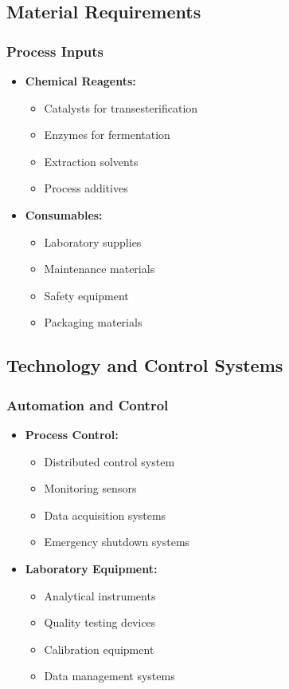 \subsection{Material Requirements}

\subsubsection{Process Inputs}
\begin{itemize}
    \item \textbf{Chemical Reagents:}
    \begin{itemize}
        \item Catalysts for transesterification
        \item Enzymes for fermentation
        \item Extraction solvents
        \item Process additives
    \end{itemize}
    
    \item \textbf{Consumables:}
    \begin{itemize}
        \item Laboratory supplies
        \item Maintenance materials
        \item Safety equipment
        \item Packaging materials
    \end{itemize}
\end{itemize}

\subsection{Technology and Control Systems}

\subsubsection{Automation and Control}
\begin{itemize}
    \item \textbf{Process Control:}
    \begin{itemize}
        \item Distributed control system
        \item Monitoring sensors
        \item Data acquisition systems
        \item Emergency shutdown systems
    \end{itemize}
    
    \item \textbf{Laboratory Equipment:}
    \begin{itemize}
        \item Analytical instruments
        \item Quality testing devices
        \item Calibration equipment
        \item Data management systems
    \end{itemize}
\end{itemize}
